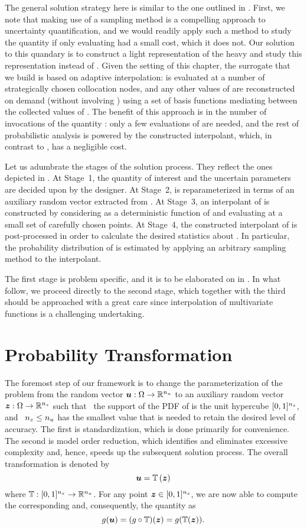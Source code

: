 The general solution strategy here is similar to the one outlined in
. First, we note that making use of a sampling method is a
compelling approach to uncertainty quantification, and we would readily apply
such a method to study the quantity \g if only evaluating \g had a small cost,
which it does not. Our solution to this quandary is to construct a light
representation of the heavy \g and study this representation instead of \g.
Given the setting of this chapter, the surrogate that we build is based on
adaptive interpolation: \g is evaluated at a number of strategically chosen
collocation nodes, and any other values of \g are reconstructed on demand
(without involving \g) using a set of basis functions mediating between the
collected values of \g. The benefit of this approach is in the number of
invocations of the quantity \g: only a few evaluations of \g are needed, and the
rest of probabilistic analysis is powered by the constructed interpolant, which,
in contrast to \g, has a negligible cost.

Let us adumbrate the stages of the solution process. They reflect the ones
depicted in . At Stage~1, the quantity of interest \g and
the uncertain parameters \vu are decided upon by the designer. At Stage~2, \g is
reparameterized in terms of an auxiliary random vector \vz extracted from \vu.
At Stage~3, an interpolant of \g is constructed by considering \g as a
deterministic function of \vz and evaluating \g at a small set of carefully
chosen points. At Stage~4, the constructed interpolant of \g is post-processed
in order to calculate the desired statistics about \g. In particular, the
probability distribution of \g is estimated by applying an arbitrary sampling
method to the interpolant.

The first stage is problem specific, and it is to be elaborated on in
. In what follow, we proceed directly to the
second stage, which together with the third should be approached with a great
care since interpolation of multivariate functions is a challenging undertaking.

\section{Probability Transformation}

The foremost step of our framework is to change the parameterization of the
problem from the random vector $\boldsymbol{u}: \Omega \to \mathbb{R}^{n_{u}}$ to an auxiliary
random vector $\boldsymbol{z}: \Omega \to \mathbb{R}^{n_{z}}$ such that \one~the support of the
\ac{PDF} of \vz is the unit hypercube $[0, 1]^{n_{z}}$, and \two~${n_{z}} \leq {n_{u}}$ has
the smallest value that is needed to retain the desired level of accuracy. The
first is standardization, which is done primarily for convenience. The second is
model order reduction, which identifies and eliminates excessive complexity and,
hence, speeds up the subsequent solution process. The overall transformation is
denoted by
\[
  \vu = \transform{\vz}
\]
where $\transform: [0, 1]^\nz \to \real^\nu$. For any point $\boldsymbol{z} \in [0,
1]^{n_{z}}$, we are now able to compute the corresponding \vu and, consequently, the
quantity \g as
\[
  \g(\vu) = (\g \circ \transform)(\vz) = \g(\transform(\vz)).
\]

